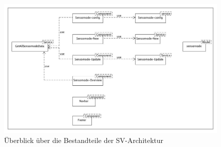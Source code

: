 \begin{figure}[!htb]
	\centering
	\includegraphics[width=\textwidth]{ressourcen/svArchitecture.jpg}
	\caption{Überblick über die Bestandteile der SV-Architektur}
	\label{fig:SVArchitecture}
\end{figure}
